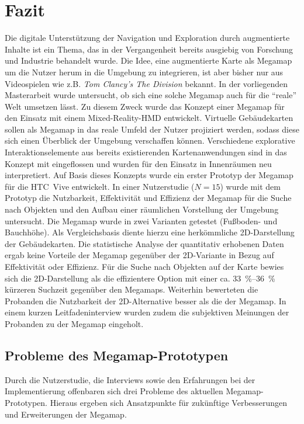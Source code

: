 \chapter{Fazit}
\label{chap:closing}
Die digitale Unterstützung der Navigation und Exploration durch augmentierte Inhalte ist ein Thema, das in der Vergangenheit bereits ausgiebig von Forschung und Industrie behandelt wurde.
Die Idee, eine augmentierte Karte als Megamap um die Nutzer herum in die Umgebung zu integrieren, ist aber bisher nur aus Videospielen wie z.B. \emph{Tom Clancy's The Division} bekannt.
In der vorliegenden Masterarbeit wurde untersucht, ob sich eine solche Megamap auch für die \enquote{reale} Welt umsetzen lässt.
Zu diesem Zweck wurde das Konzept einer Megamap für den Einsatz mit einem Mixed-Reality-HMD entwickelt.
Virtuelle Gebäudekarten sollen als Megamap in das reale Umfeld der Nutzer projiziert werden, sodass diese sich einen Überblick der Umgebung verschaffen können.
Verschiedene explorative Interaktionselemente aus bereits existierenden Kartenanwendungen sind in das Konzept mit eingeflossen und wurden für den Einsatz in Innenräumen neu interpretiert.
Auf Basis dieses Konzepts wurde ein erster Prototyp der Megamap für die HTC~Vive entwickelt.
In einer Nutzerstudie ($N=15$) wurde mit dem Prototyp die Nutzbarkeit, Effektivität und Effizienz der Megamap für die Suche nach Objekten und den Aufbau einer räumlichen Vorstellung der Umgebung untersucht.
Die Megamap wurde in zwei Varianten getestet (Fußboden- und Bauchhöhe).
Als Vergleichsbasis diente hierzu eine herkömmliche 2D-Darstellung der Gebäudekarten.
Die statistische Analyse der quantitativ erhobenen Daten ergab keine Vorteile der Megamap gegenüber der 2D-Variante in Bezug auf Effektivität oder Effizienz.
Für die Suche nach Objekten auf der Karte bewies sich die 2D-Darstellung als die effizientere Option mit einer ca. \SIrange{33}{36}{\percent} kürzeren Suchzeit gegenüber den Megamaps.
Weiterhin bewerteten die Probanden die Nutzbarkeit der 2D-Alternative besser als die der Megamap.
In einem kurzen Leitfadeninterview wurden zudem die subjektiven Meinungen der Probanden zu der Megamap eingeholt.

\section{Probleme des Megamap-Prototypen}
Durch die Nutzerstudie, die Interviews sowie den Erfahrungen bei der Implementierung offenbaren sich drei Probleme des aktuellen Megamap-Prototypen.
Hieraus ergeben sich Ansatzpunkte für zukünftige Verbesserungen und Erweiterungen der Megamap.

